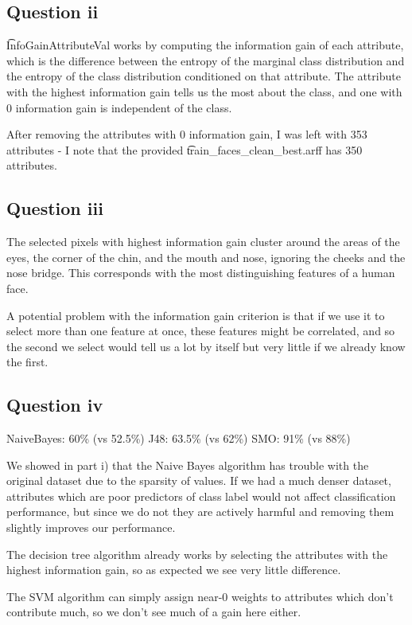 \documentclass[a4paper]{article}
\begin{document}
\subsection*{Question ii}
\t{InfoGainAttributeVal} works by computing the information gain of each attribute, which is the difference between the entropy of the marginal class distribution and the entropy of the class distribution conditioned on that attribute. The attribute with the highest information gain tells us the most about the class, and one with 0 information gain is independent of the class.

After removing the attributes with 0 information gain, I was left with 353 attributes - I note that the provided \t{train_faces_clean_best.arff} has 350 attributes.

\subsection*{Question iii}
The selected pixels with highest information gain cluster around the areas of the eyes, the corner of the chin, and the mouth and nose, ignoring the cheeks and the nose bridge. This corresponds with the most distinguishing features of a human face.



A potential problem with the information gain criterion is that if we use it to select more than one feature at once, these features might be correlated, and so the second we select would tell us a lot by itself but very little if we already know the first.

\subsection*{Question iv}
NaiveBayes: 60\% (vs 52.5\%)
J48: 63.5\% (vs 62\%)
SMO: 91\% (vs 88\%)

We showed in part i) that the Naive Bayes algorithm has trouble with the original dataset due to the sparsity of values. If we had a much denser dataset, attributes which are poor predictors of class label would not affect classification performance, but since we do not they are actively harmful and removing them slightly improves our performance.

The decision tree algorithm already works by selecting the attributes with the highest information gain, so as expected we see very little difference.

The SVM algorithm can simply assign near-0 weights to attributes which don't contribute much, so we don't see much of a gain here either.
\end{document}
